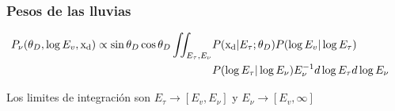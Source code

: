 	
	\subsubsection{Pesos de las lluvias}
	
	\begin{equation}
		\begin{aligned}
			P_\nu(\theta_D,\log E_v,{\rm x_d})
			\propto
			\sin{\theta_D}\cos{\theta_D}
			\iint_{E_\tau,E_\nu}&
			P({\rm x_d}|E_\tau;\theta_D)
			P(\log{E_v}|\log{E_\tau})&\\
			&P(\log{E_\tau}|\log{E_\nu})
			E_\nu^{-1}
			d\log{E_\tau}d\log{E_\nu}
		\end{aligned}
	\end{equation}
	
	Los limites de integraci\'on son $E_\tau\rightarrow\left[E_v,E_\nu\right]$ y $E_\nu\rightarrow\left[E_v,\infty\right]$
	
